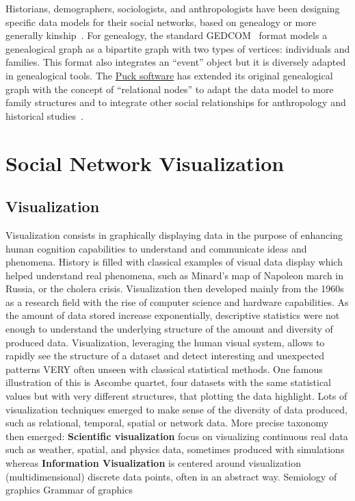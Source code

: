Historians, demographers, sociologists, and anthropologists have been designing specific data models for their social networks, based on genealogy or more generally kinship~\cite{hamberger:halshs-00658667}. For genealogy, the standard GEDCOM~\cite{gedcom} format models a genealogical graph as a bipartite graph with two types of vertices: individuals and families. This format also integrates an ``event'' object but it is diversely adapted in genealogical tools. The \href{https://www.kintip.net/}{Puck software} has extended its original genealogical graph with the concept of ``relational nodes'' to adapt the data model to more family structures and to integrate other social relationships for anthropology and historical studies~\cite{hamberger_scanning_2014}.






\section{Social Network Visualization}


\subsection{Visualization}

Visualization consists in graphically displaying data in the purpose of enhancing human cognition capabilities to understand and communicate ideas and phenomena.
History is filled with classical examples of visual data display which helped understand real phenomena, such as Minard's map of Napoleon march in Russia, or the cholera crisis.
Visualization then developed mainly from the 1960s as a research field with the rise of computer science and hardware capabilities.
As the amount of data stored increase exponentially, descriptive statistics were not enough to understand the underlying structure of the amount and diversity of produced data.
Visualization, leveraging the human visual system, allows to rapidly see the structure of a dataset and detect interesting and unexpected patterns VERY often unseen with classical statistical methods. One famous illustration of this is Ascombe quartet, four datasets with the same statistical values but with very different structures, that plotting the data highlight.
Lots of visualization techniques emerged to make sense of the diversity of data produced, such as relational, temporal, spatial or network data.
More precise taxonomy then emerged: \textbf{Scientific visualization} focus on visualizing continuous real data such as weather, spatial, and physics data, sometimes produced with simulations whereas \textbf{Information Visualization} is centered around visualization (multidimensional) discrete data points, often in an abstract way.
Semiology of graphics
Grammar of graphics



